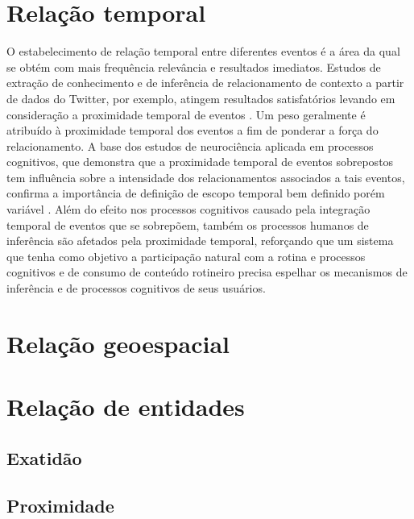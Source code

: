 \section{Relação temporal}

O estabelecimento de relação temporal entre diferentes eventos é a área da qual se obtém com mais frequência relevância e resultados imediatos. Estudos de extração de conhecimento e de inferência de relacionamento de contexto a partir de dados do Twitter, por exemplo, atingem resultados satisfatórios levando em consideração a proximidade temporal de eventos \cite{extracting:fromtwitter}. Um peso geralmente é atribuído à proximidade temporal dos eventos a fim de ponderar a força do relacionamento. A base dos estudos de neurociência aplicada em processos cognitivos, que demonstra que a proximidade temporal de eventos sobrepostos tem influência sobre a intensidade dos relacionamentos associados a tais eventos, confirma a importância de definição de escopo temporal bem definido porém variável \cite{Zeithamova2017TemporalPP}. Além do efeito nos processos cognitivos causado pela integração temporal de eventos que se sobrepõem, também os processos humanos de inferência são afetados pela proximidade temporal, reforçando que um sistema que tenha como objetivo a participação natural com a rotina e processos cognitivos e de consumo de conteúdo rotineiro precisa espelhar os mecanismos de inferência e de processos cognitivos de seus usuários.

\section{Relação geoespacial}
\section{Relação de entidades}
\subsection{Exatidão}
\subsection{Proximidade}